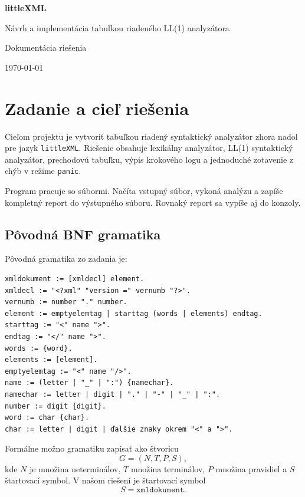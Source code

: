 \documentclass[12pt,a4paper]{article}
\newcommand{\code}[1]{\ifmmode\text{\ttfamily #1}\else\texttt{#1}\fi}
\begin{document}
\begin{titlepage}
    \centering
    \vspace*{2cm}
    {\LARGE\bfseries littleXML\par}
    \vspace{0.5cm}
    {\Large Návrh a implementácia tabuľkou riadeného LL(1) analyzátora\par}
    \vfill
    {\large Dokumentácia riešenia\par}
    \vspace{0.5cm}
    {\large \today\par}
\end{titlepage}

\tableofcontents
\newpage

\section{Zadanie a cieľ riešenia}

Cieľom projektu je vytvoriť tabuľkou riadený syntaktický analyzátor zhora nadol pre jazyk \code{littleXML}. Riešenie obsahuje lexikálny analyzátor, LL(1) syntaktický analyzátor, prechodovú tabuľku, výpis krokového logu a jednoduché zotavenie z chýb v režime \code{panic}.

Program pracuje so súbormi. Načíta vstupný súbor, vykoná analýzu a zapíše kompletný report do výstupného súboru. Rovnaký report sa vypíše aj do konzoly.

\subsection{Pôvodná BNF gramatika}

Pôvodná gramatika zo zadania je:

\begin{lstlisting}
xmldokument := [xmldecl] element.
xmldecl := "<?xml" "version =" vernumb "?>".
vernumb := number "." number.
element := emptyelemtag | starttag (words | elements) endtag.
starttag := "<" name ">".
endtag := "</" name ">".
words := {word}.
elements := [element].
emptyelemtag := "<" name "/>".
name := (letter | "_" | ":") {namechar}.
namechar := letter | digit | "." | "-" | "_" | ":".
number := digit {digit}.
word := char {char}.
char := letter | digit | ďalšie znaky okrem "<" a ">".
\end{lstlisting}

Formálne možno gramatiku zapísať ako štvoricu
\[
G = (N, T, P, S),
\]
kde \(N\) je množina neterminálov, \(T\) množina terminálov, \(P\) množina pravidiel a \(S\) štartovací symbol. V našom riešení je štartovací symbol
\[
S = \texttt{xmldokument}.
\]
\end{document}
